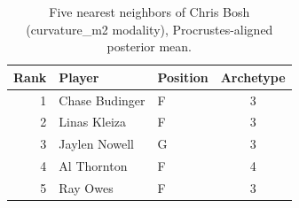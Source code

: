\begin{table}[htbp]
  \centering\small
  \begin{tabular}{rllc}
    \toprule
    Rank & Player & Position & Archetype \\
    \midrule
    1 & Chase Budinger & F & 3 \\
    2 & Linas Kleiza & F & 3 \\
    3 & Jaylen Nowell & G & 3 \\
    4 & Al Thornton & F & 4 \\
    5 & Ray Owes & F & 3 \\
    \bottomrule
  \end{tabular}
  \caption{Five nearest neighbors of Chris Bosh (curvature_m2 modality), Procrustes-aligned posterior mean.}
  \label{tab:Chris_Bosh_neighbors_curvature_m2}
\end{table}

